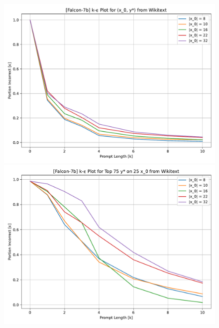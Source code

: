 \documentclass{article} %
\begin{document}
\begin{figure}[ht]
    \centering
    \begin{minipage}[b]{0.48\textwidth}
        \includegraphics[width=\textwidth]{figs/og_falcon7b_k_epsilon.pdf}
    \end{minipage}
    \hfill
    \begin{minipage}[b]{0.48\textwidth}
        \includegraphics[width=\textwidth]{figs/shallow1_falcon7b_k_epsilon.pdf}
    \end{minipage}

    \vspace{1em} %



\end{figure}
\end{document}
